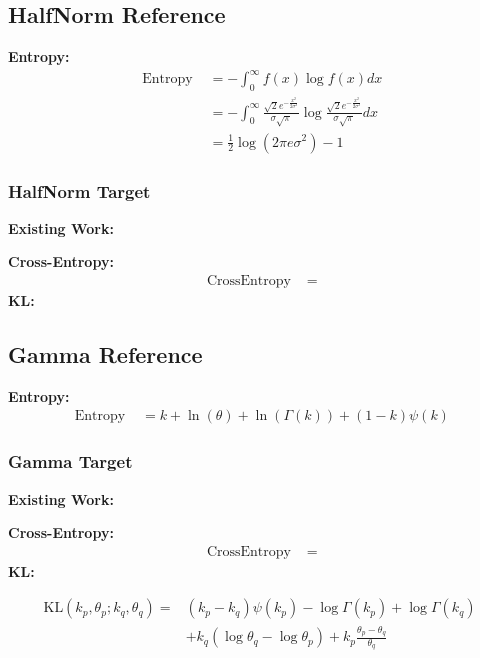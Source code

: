 \documentclass{article}
\begin{document}
\subsection{HalfNorm Reference}

\noindent \textbf{Entropy:}
$$ \begin{aligned} \text { Entropy }&=-\int_{0}^{\infty} f(x) \log f(x) d x\\&=-\int_{0}^{\infty}\frac{\sqrt{2}e^{-\frac{x^{2} }{2\sigma^{2}}}}{\sigma\sqrt{\pi}}\log\frac{\sqrt{2}e^{-\frac{x^{2} }{2\sigma^{2}}}}{\sigma\sqrt{\pi}} d x\\&=\frac{1}{2} \log\left(2 \pi e \sigma^{2}\right)-1
\end{aligned} $$

\subsubsection{HalfNorm Target}

\noindent \textbf{Existing Work:}

\noindent \textbf{Cross-Entropy:}
$$ \begin{aligned} \text { CrossEntropy }&=
\end{aligned} $$
\noindent \textbf{KL:}

\subsection{Gamma Reference}

\noindent \textbf{Entropy:}
$$ \begin{aligned} \text { Entropy }&=k+\ln (\theta)+\ln (\Gamma(k))+(1-k) \psi(k) \end{aligned} $$

\subsubsection{Gamma Target}

\noindent \textbf{Existing Work:}

\noindent \textbf{Cross-Entropy:}
$$ \begin{aligned} \text { CrossEntropy }&=
\end{aligned} $$
\noindent \textbf{KL:}

$$ \begin{aligned} \mathrm{KL}\left(k_{p}, \theta_{p} ; k_{q}, \theta_{q}\right)=&\left(k_{p}-k_{q}\right) \psi\left(k_{p}\right)-\log \Gamma\left(k_{p}\right)+\log \Gamma\left(k_{q}\right) \\
&+k_{q}\left(\log \theta_{q}-\log \theta_{p}\right)+k_{p} \frac{\theta_{p}-\theta_{q}}{\theta_{q}}\end{aligned} $$
\end{document}
